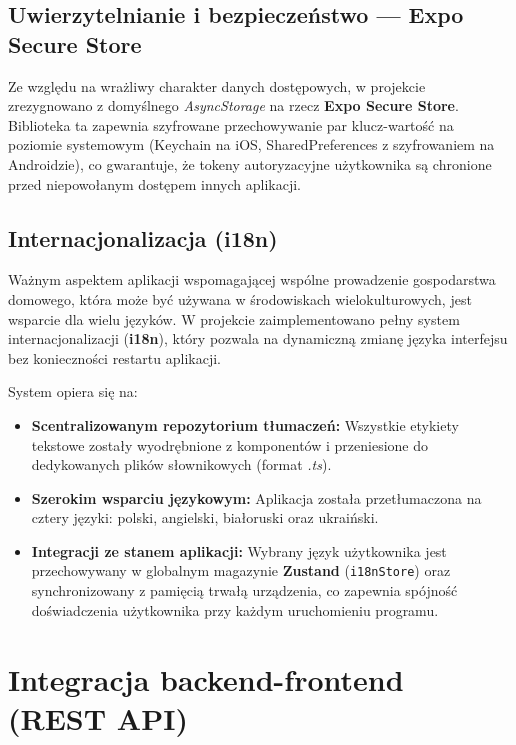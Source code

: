 \subsection{Uwierzytelnianie i bezpieczeństwo --- Expo Secure Store}

Ze względu na wrażliwy charakter danych dostępowych, w projekcie zrezygnowano z domyślnego \textit{AsyncStorage} na rzecz \textbf{Expo Secure Store}. Biblioteka ta zapewnia szyfrowane przechowywanie par klucz-wartość na poziomie systemowym (Keychain na iOS, SharedPreferences z szyfrowaniem na Androidzie), co gwarantuje, że tokeny autoryzacyjne użytkownika są chronione przed niepowołanym dostępem innych aplikacji.

\subsection{Internacjonalizacja (i18n)}

Ważnym aspektem aplikacji wspomagającej wspólne prowadzenie gospodarstwa domowego, która może być używana w środowiskach wielokulturowych, jest wsparcie dla wielu języków. W projekcie zaimplementowano pełny system internacjonalizacji (\textbf{i18n}), który pozwala na dynamiczną zmianę języka interfejsu bez konieczności restartu aplikacji.

System opiera się na:
\begin{itemize}
    \item \textbf{Scentralizowanym repozytorium tłumaczeń:} Wszystkie etykiety tekstowe zostały wyodrębnione z komponentów i przeniesione do dedykowanych plików słownikowych (format \textit{.ts}).
    \item \textbf{Szerokim wsparciu językowym:} Aplikacja została przetłumaczona na cztery języki: polski, angielski, białoruski oraz ukraiński.
    \item \textbf{Integracji ze stanem aplikacji:} Wybrany język użytkownika jest przechowywany w globalnym magazynie \textbf{Zustand} (\texttt{i18nStore}) oraz synchronizowany z pamięcią trwałą urządzenia, co zapewnia spójność doświadczenia użytkownika przy każdym uruchomieniu programu.
\end{itemize}
\section{Integracja backend-frontend (REST API)}

